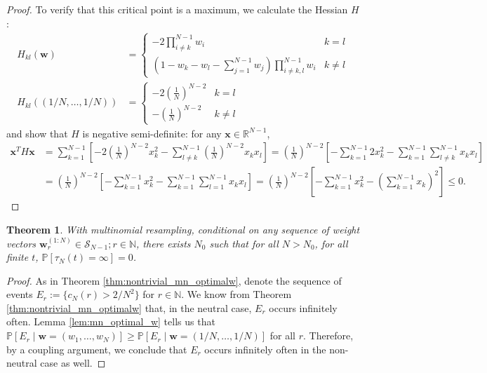 \documentclass{article}
\newtheorem{thm}{Theorem}
\newcommand{\PR}{\mathbb{P}}
\begin{document}
\begin{proof}
To verify that this critical point is a maximum, we calculate the Hessian $H$:
\begin{align*}
H_{kl}(\mathbf{w})
&= \begin{cases}
-2 \prod_{i\neq k}^{N-1} w_i & k=l \\
\left( 1 - w_k - w_l - \sum_{j=1}^{N-1} w_j \right)\prod_{i\neq k,l}^{N-1}w_i & k\neq l
\end{cases} \\
H_{kl}((1/N, \dots, 1/N))&= \begin{cases}
-2 \left(\frac{1}{N}\right)^{N-2} & k=l \\
- \left(\frac{1}{N}\right)^{N-2} & k\neq l
\end{cases}
\end{align*}
and show that $H$ is negative semi-definite: for any $\mathbf{x} \in \mathbb{R}^{N-1}$,
\begin{align*}
\mathbf{x}^T H \mathbf{x} &= \sum_{k=1}^{N-1} \left[ -2\left(\frac{1}{N}\right)^{N-2} x_k^2
- \sum_{l\neq k}^{N-1} \left(\frac{1}{N}\right)^{N-2} x_k x_l \right] 
= \left(\frac{1}{N}\right)^{N-2} \left[ -\sum_{k=1}^{N-1} 2x_k^2 - \sum_{k=1}^{N-1} \sum_{l\neq k}^{N-1} x_k x_l \right] \\
&= \left(\frac{1}{N}\right)^{N-2} \left[ -\sum_{k=1}^{N-1} x_k^2 - \sum_{k=1}^{N-1} \sum_{l=1}^{N-1} x_k x_l \right]
= \left(\frac{1}{N}\right)^{N-2} \left[ - \sum_{k=1}^{N-1} x_k^2 - \left(\sum_{k=1}^{N-1} x_k \right)^2 \right]
\leq 0 .
\end{align*}
\end{proof}

\begin{thm}
With multinomial resampling, conditional on any sequence of weight vectors $\mathbf{w}_r^{(1:N)} \in \mathcal{S}_{N-1}; r\in\mathbb{N}$, there exists $N_0$ such that for all $N>N_0$, for all finite $t$, $\PR[\tau_N(t) = \infty] =0$.
\end{thm}

\begin{proof}
As in Theorem \ref{thm:nontrivial_mn_optimalw}, denote the sequence of events 
$E_r := \{ c_N(r) > 2/N^2 \}$ for $r \in \mathbb{N}$.
We know from Theorem \ref{thm:nontrivial_mn_optimalw} that, in the neutral case, $E_r$ occurs infinitely often. Lemma \ref{lem:mn_optimal_w} tells us that 
$\PR[E_r \mid \mathbf{w}=(w_1, \dots, w_N)] \geq \PR[E_r \mid \mathbf{w}=(1/N, \dots, 1/N)]$
for all $r$. 
Therefore, by a coupling argument, we conclude that $E_r$ occurs infinitely often in the non-neutral case as well.
\end{proof}
\end{document}
